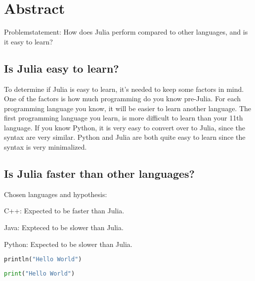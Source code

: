 \documentclass[a4paper,11pt]{article}
\begin{document}
\section*{Abstract}
Problemstatement:
How does Julia perform compared to other languages, and is it easy to learn?

\subsection*{Is Julia easy to learn?}
To determine if Julia is easy to learn, it's needed to keep some factors in mind. One of the factors is how much programming do you know pre-Julia. For each programming language you know, it will be easier to learn another language. The first programming language you learn, is more difficult to learn than your 11th language. If you know Python, it is very easy to convert over to Julia, since the syntax are very similar. Python and Julia are both quite easy to learn since the syntax is very minimalized.

\subsection*{Is Julia faster than other languages?}
Chosen languages and hypothesis:
\begin{list}{}{}
	\item C++: Expected to be faster than Julia.
	\item Java: Expteced to be slower than Julia.
	\item Python: Expected to be slower than Julia.
\end{list}

\begin{lstlisting}[caption=Hello World in Julia, language=python]
println("Hello World")
\end{lstlisting}

\begin{lstlisting}[caption=Hello World in Python, language=python]
print("Hello World")
\end{lstlisting}
\end{document}
